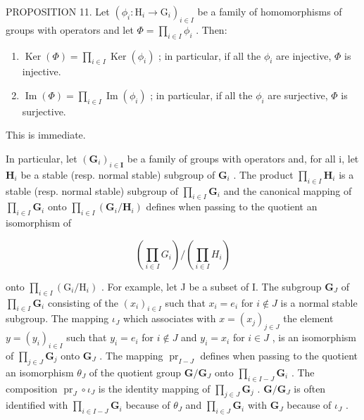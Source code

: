 PROPOSITION 11. Let \((\phi_i: \mathrm{H}_i \to \mathrm{G}_i)_{i \in I}\) be a family of homomorphisms of groups with operators and let \(\Phi = \prod_{i \in I} \phi_i\) . Then:

\begin{enumerate}
\def\labelenumi{(\alph{enumi})}
\item
  \(\operatorname{Ker}(\Phi) = \prod_{i \in I} \operatorname{Ker}(\phi_i)\) ; in particular, if all the \(\phi_i\) are injective, \(\Phi\) is injective.
\item
  \(\operatorname{Im}(\Phi) = \prod_{i\in I}\operatorname{Im}(\phi_i)\) ; in particular, if all the \(\phi_i\) are surjective, \(\Phi\) is surjective.
\end{enumerate}

This is immediate.

In particular, let \((\mathbf{G}_{i})_{i\in\mathbf{I}}\) be a family of groups with operators and, for all i, let \(\mathbf{H}_i\) be a stable (resp. normal stable) subgroup of \(\mathbf{G}_i\) . The product \(\prod_{i\in I}\mathbf{H}_i\) is a stable (resp. normal stable) subgroup of \(\prod_{i\in I}\mathbf{G}_i\) and the canonical mapping of \(\prod_{i\in I}\mathbf{G}_i\) onto \(\prod_{i\in I}(\mathbf{G}_i / \mathbf{H}_i)\) defines when passing to the quotient an isomorphism of

\[
\left(\prod_ {i \in I} G _ {i}\right) / \left(\prod_ {i \in I} H _ {i}\right)
\]

onto \(\prod_{i\in I}(\mathrm{G}_i / \mathrm{H}_i)\) . For example, let J be a subset of I. The subgroup \(\mathbf{G}_{J}\) of \(\prod_{i\in I}\mathbf{G}_i\) consisting of the \((x_{i})_{i\in I}\) such that \(x_{i} = e_{i}\) for \(i\notin J\) is a normal stable subgroup. The mapping \(\iota_{J}\) which associates with \(x = (x_{j})_{j\in J}\) the element \(y = (y_{i})_{i\in I}\) such that \(y_{i} = e_{i}\) for \(i\notin J\) and \(y_{i} = x_{i}\) for \(i\in J\) , is an isomorphism of \(\prod_{j\in J}\mathbf{G}_j\) onto \(\mathbf{G}_{J}\) . The mapping \(\operatorname{pr}_{I - J}\) defines when passing to the quotient an isomorphism \(\theta_J\) of the quotient group \(\mathbf{G} / \mathbf{G}_J\) onto \(\prod_{i\in I - J}\mathbf{G}_i\) . The composition \(\operatorname{pr}_J\circ \iota_J\) is the identity mapping of \(\prod_{j\in J}\mathbf{G}_j\) . \(\mathbf{G} / \mathbf{G}_J\) is often identified with \(\prod_{i\in I - J}\mathbf{G}_i\) because of \(\theta_J\) and \(\prod_{i\in J}\mathbf{G}_i\) with \(\mathbf{G}_J\) because of \(\iota_J\) .

